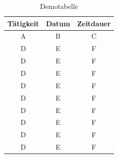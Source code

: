\begin{table}
\caption{Demotabelle}
\begin{center}
	
\begin{tabular}{ |c|c|c| }
	\hline
	Tätigkeit & Datum & Zeitdauer \\
	\hline
	A         & B     & C         \\
	\hline
	D         & E     & F         \\
	\hline
		D         & E     & F         \\
	\hline
		D         & E     & F         \\
	\hline
		D         & E     & F         \\
	\hline
		D         & E     & F         \\
	\hline
		D         & E     & F         \\
	\hline
		D         & E     & F         \\
	\hline
		D         & E     & F         \\
	\hline
		D         & E     & F         \\
	\hline
\end{tabular}

\end{center}
\end{table}